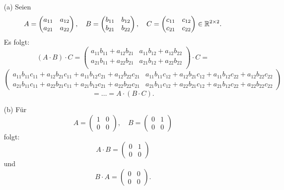 \documentclass[
				a4paper,
				10pt
			]
			{scrartcl}
\begin{document}
\begin{itemize}
	\item[(a)]	Seien
		$$
			A 
			=
			\begin{pmatrix}
				a_{11}	&a_{12}	\\
				a_{21}	&a_{22}
			\end{pmatrix}, \quad
			B 
			=
			\begin{pmatrix}
				b_{11}	&b_{12}	\\
				b_{21}	&b_{22}
			\end{pmatrix}, \quad		
			C 
			=
			\begin{pmatrix}
				c_{11}	&c_{12}	\\
				c_{21}	&c_{22}
			\end{pmatrix}
			\in \mathbb{R}^{2\times 2}.		
		$$
		Es folgt:
		$$
			(A\cdot B) \cdot C	
			=
			\begin{pmatrix}
				a_{11}b_{11} + a_{12}b_{21}	&	a_{11}b_{12} + a_{12}b_{22}	\\
				a_{21}b_{11} + a_{22}b_{21}	&	a_{21}b_{12} + a_{22}b_{22}	\\
			\end{pmatrix}
			\cdot C
			=
		$$
		$$													
			\begin{pmatrix}
				a_{11}b_{11}c_{11} + a_{12}b_{21}c_{11} +  a_{11}b_{12}c_{21} + a_{12}b_{22}c_{21}	
					&	a_{11}b_{11}c_{12} + a_{12}b_{21}c_{12} +  a_{11}b_{12}c_{22} + a_{12}b_{22}c_{22}	\\
				a_{21}b_{11}c_{11} + a_{22}b_{21}c_{11} +  a_{21}b_{12}c_{21} + a_{22}b_{22}c_{21}	
					&	a_{21}b_{11}c_{12} + a_{22}b_{21}c_{12} +  a_{21}b_{12}c_{22} + a_{22}b_{22}c_{22}
			\end{pmatrix}			
		$$
		$$
			= \ldots
			= A\cdot(B\cdot C).
		$$
	\item[(b)]
		F\"ur 
		$$
			A
			=
			\begin{pmatrix}
				1	&	0	\\
				0	&	0
			\end{pmatrix}, \quad			
			B
			=
			\begin{pmatrix}
				0	&	1	\\
				0	&	0
			\end{pmatrix}			
		$$
		folgt:
		$$
			A \cdot B = 
			\begin{pmatrix}
				0	&	1	\\
				0	&	0
			\end{pmatrix}
		$$
		und
		$$
			B \cdot A = 
			\begin{pmatrix}
				0	&	0	\\
				0	&	0
			\end{pmatrix}.
$$
\end{itemize}
\end{document}
